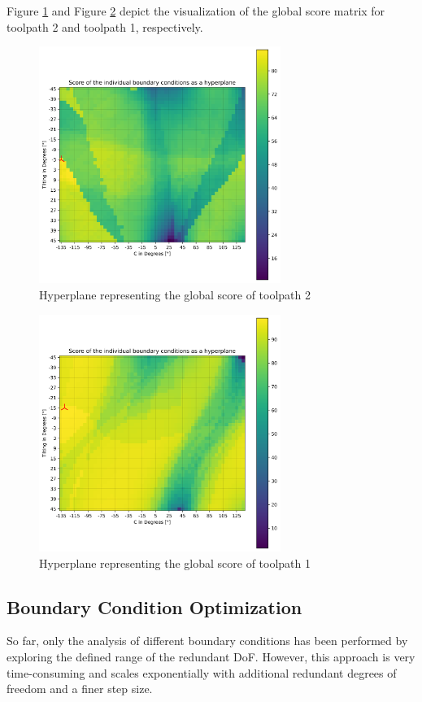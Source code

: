 Figure \ref{best_2D_tp2} and Figure \ref{best_2D_tp1} depict the visualization of the global score matrix for toolpath 2 and toolpath 1, respectively.

\begin{figure}[H]
	\centerline{\includegraphics[width=0.7\textwidth]{figures/best_2D_2.png}}
	\caption{Hyperplane representing the global score of toolpath 2}
	\label{best_2D_tp2}
\end{figure}
\begin{figure}[H]
	\centerline{\includegraphics[width=0.7\textwidth]{figures/best_2D_1.png}}
	\caption{Hyperplane representing the global score of toolpath 1}
	\label{best_2D_tp1}
\end{figure}




\newpage
\subsection{Boundary Condition Optimization }
So far, only the analysis of different boundary conditions has been performed by exploring the defined range of the redundant DoF. However, this approach is very time-consuming and scales exponentially with additional redundant degrees of freedom and a finer step size.


